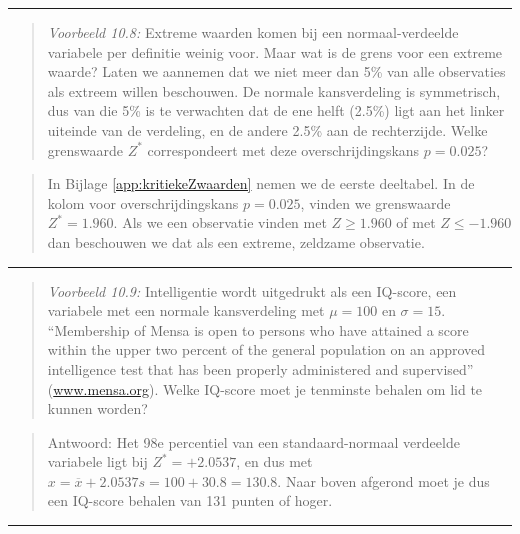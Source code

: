 \documentclass[
]{book}
\begin{document}
\begin{center}\rule{0.5\linewidth}{0.5pt}\end{center}

\begin{quote}
\emph{Voorbeeld 10.8:}
Extreme waarden komen bij een normaal-verdeelde variabele per definitie
weinig voor. Maar wat is de grens voor een extreme waarde? Laten we
aannemen dat we niet meer dan 5\% van alle observaties als extreem willen
beschouwen. De normale kansverdeling is symmetrisch, dus van die 5\% is
te verwachten dat de ene helft (2.5\%) ligt aan het linker uiteinde van
de verdeling, en de andere 2.5\% aan de rechterzijde. Welke grenswaarde
\(Z^*\) correspondeert met deze overschrijdingskans \(p=0.025\)?
\end{quote}

\begin{quote}
In
Bijlage \ref{app:kritiekeZwaarden} nemen we de eerste deeltabel. In de kolom
voor overschrijdingskans \(p=0.025\), vinden we grenswaarde
\(Z^*=1.960\). Als we een observatie vinden met \(Z \ge 1.960\) of met
\(Z \le -1.960\) dan beschouwen we dat als een extreme, zeldzame
observatie.
\end{quote}

\begin{center}\rule{0.5\linewidth}{0.5pt}\end{center}

\begin{quote}
\emph{Voorbeeld 10.9:}
Intelligentie wordt uitgedrukt als een IQ-score, een variabele met een
normale kansverdeling met \(\mu=100\) en \(\sigma=15\). ``Membership of Mensa
is open to persons who have attained a score within the upper two
percent of the general population on an approved intelligence test that
has been properly administered and supervised''
(\url{www.mensa.org}). Welke IQ-score moet je tenminste
behalen om lid te kunnen worden?
\end{quote}

\begin{quote}
Antwoord: Het 98e percentiel van een standaard-normaal verdeelde
variabele ligt bij \(Z^*=+2.0537\), en dus met
\(x=\overline{x}+2.0537 s = 100+30.8 = 130.8\). Naar boven afgerond moet
je dus een IQ-score behalen van 131 punten of hoger.
\end{quote}

\begin{center}\rule{0.5\linewidth}{0.5pt}\end{center}
\end{document}
